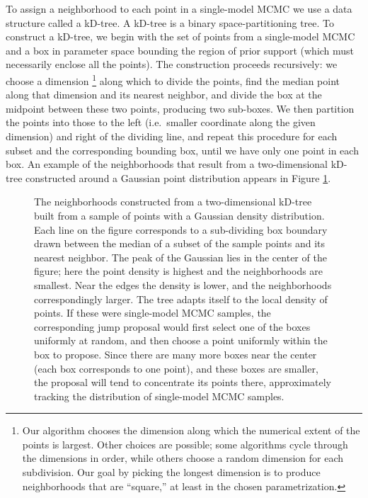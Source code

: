 \documentclass[preprint]{aastex}
\begin{document}
To assign a neighborhood to each point in a single-model MCMC we use a
data structure called a kD-tree.  A kD-tree is a binary
space-partitioning tree.  To construct a kD-tree, we begin with the
set of points from a single-model MCMC and a box in parameter space
bounding the region of prior support (which must necessarily enclose
all the points).  The construction proceeds recursively: we choose a
dimension%
\footnote{Our algorithm chooses the dimension along which the
  numerical extent of the points is largest.  Other choices are
  possible; some algorithms cycle through the dimensions in order,
  while others choose a random dimension for each subdivision.  Our
  goal by picking the longest dimension is to produce neighborhoods
  that are ``square,'' at least in the chosen parametrization.} %
along which to divide the points, find the median point along that
dimension and its nearest neighbor, and divide the box at the midpoint
between these two points, producing two sub-boxes.  We then partition
the points into those to the left (i.e.\ smaller coordinate along the
given dimension) and right of the dividing line, and repeat this
procedure for each subset and the corresponding bounding box, until we
have only one point in each box.  An example of the neighborhoods that
result from a two-dimensional kD-tree constructed around a Gaussian
point distribution appears in Figure \ref{fig:kD-tree}.

\begin{figure}
  \begin{center}
  \end{center}
  \caption{\label{fig:kD-tree} The neighborhoods constructed from a
    two-dimensional kD-tree built from a sample of points with a
    Gaussian density distribution.  Each line on the figure
    corresponds to a sub-dividing box boundary drawn between the
    median of a subset of the sample points and its nearest
    neighbor. The peak of the Gaussian lies in the center of the
    figure; here the point density is highest and the neighborhoods
    are smallest.  Near the edges the density is lower, and the
    neighborhoods correspondingly larger.  The tree adapts itself to
    the local density of points.  If these were single-model MCMC
    samples, the corresponding jump proposal would first select one of
    the boxes uniformly at random, and then choose a point uniformly
    within the box to propose.  Since there are many more boxes near
    the center (each box corresponds to one point), and these boxes
    are smaller, the proposal will tend to concentrate its points
    there, approximately tracking the distribution of single-model
    MCMC samples.}
\end{figure}
\end{document}
